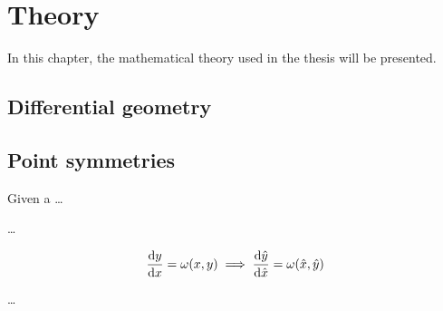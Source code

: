 \chapter{Theory}

In this chapter, the mathematical theory used in the thesis will be presented.

\section{Differential geometry}

\section{Point symmetries}

Given a \dots

\dots

\begin{equation} \label{eq:first-order-ode}
  \dv{y}{x} = \omega(x,y)
  \implies
  \dv{\hat{y}}{\hat{x}} = \omega(\hat{x},\hat{y})
\end{equation}

\dots

